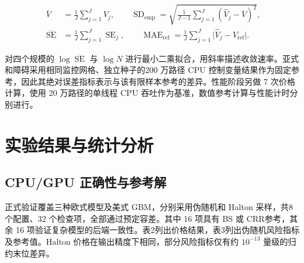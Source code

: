 \documentclass[UTF8,a4paper,zihao=5,fontset=none]{ctexart}
\begin{document}
\nopagebreak[4]
\begin{equation}
\label{eq:13}
\begin{aligned}
\overline V&=\frac1J\sum_{j=1}^{J}\widehat V_j,\qquad
\operatorname{SD}_{\mathrm{emp}}=
\sqrt{\frac1{J-1}\sum_{j=1}^{J}(\widehat V_j-\overline V)^2},\\
\overline{\operatorname{SE}}&=\frac1J\sum_{j=1}^{J}\operatorname{SE}_j,
\qquad
\operatorname{MAE}_{\mathrm{ref}}=
\frac1J\sum_{j=1}^{J}\lvert\widehat V_j-V_{\mathrm{ref}}\rvert.
\end{aligned}
\end{equation}

对四个规模的 $\log\overline{\operatorname{SE}}$ 与 $\log N$ 进行最小二乘拟合，用斜率描述收敛速率。亚式和障碍采用相同监控网格、独立种子的200 万路径 CPU 控制变量结果作为固定参考，因此其绝对误差指标表示与该有限样本参考的差异。性能阶段另做 7 次价格计算，使用 20 万路径的单线程 CPU 吞吐作为基准，数值参考计算与性能计时分别进行。


\section{实验结果与统计分析}

\subsection{CPU/GPU 正确性与参考解}

正式验证覆盖三种欧式模型及美式 GBM，分别采用伪随机和 Halton 采样，共8 个配置、32 个检查项，全部通过预定容差。其中 16 项具有 BS 或 CRR参考，其余 16 项验证复杂模型的后端一致性。表2列出价格结果，表3列出伪随机风险指标及参考值。Halton 价格在输出精度下相同，部分风险指标仅有约 $10^{-13}$ 量级的归约末位差异。
\end{document}
